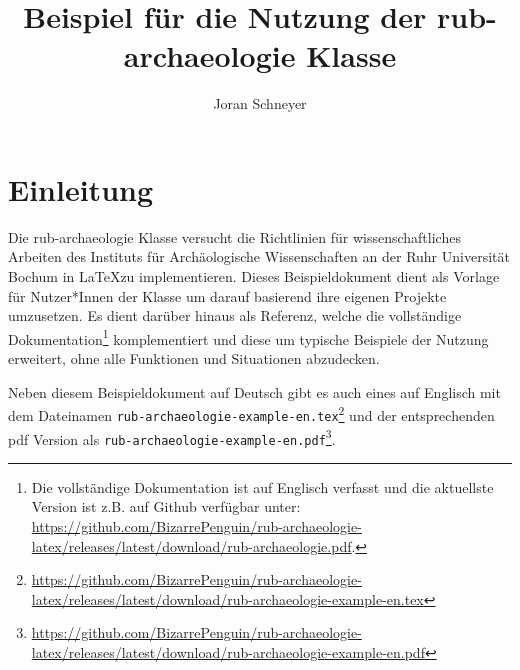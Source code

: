 \documentclass{rub-archaeologie}
\title{Beispiel für die Nutzung der \textsf{rub-archaeologie} Klasse}
\author{Joran Schneyer}
\begin{document}
    \maketitle

    \tableofcontents
    \clearpage

    \section{Einleitung}
    Die \textsf{rub-archaeologie} Klasse versucht die Richtlinien für wissenschaftliches Arbeiten des Instituts für Archäologische Wissenschaften an der Ruhr Universität Bochum in \LaTeX zu implementieren.
    Dieses Beispieldokument dient als Vorlage für Nutzer*Innen der Klasse um darauf basierend ihre eigenen Projekte umzusetzen. Es dient darüber hinaus als Referenz, welche die vollständige Dokumentation\footnote{Die vollständige Dokumentation ist auf Englisch verfasst und die aktuellste Version ist z.B. auf Github verfügbar unter: \url{https://github.com/BizarrePenguin/rub-archaeologie-latex/releases/latest/download/rub-archaeologie.pdf}.} komplementiert und diese um typische Beispiele der Nutzung erweitert, ohne alle Funktionen und Situationen abzudecken.

    Neben diesem Beispieldokument auf Deutsch gibt es auch eines auf Englisch mit dem Dateinamen \texttt{rub-archaeologie-example-en.tex}\footnote{\url{https://github.com/BizarrePenguin/rub-archaeologie-latex/releases/latest/download/rub-archaeologie-example-en.tex}} und der entsprechenden pdf Version als \texttt{rub-archaeologie-example-en.pdf}\footnote{\url{https://github.com/BizarrePenguin/rub-archaeologie-latex/releases/latest/download/rub-archaeologie-example-en.pdf}}.
\end{document}
